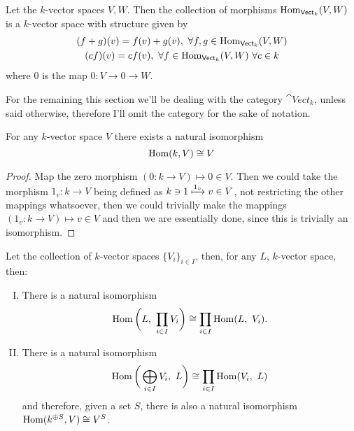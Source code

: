 \begin{definition}
  Let the \(k\)-vector spaces \(V, W\). Then the collection of morphisms
  \(\operatorname{Hom}_{\mathsf{Vect}_k}(V, W)\) is a \(k\)-vector space with structure given by
  \begin{gather*}
    (f + g)(v) = f(v) + g(v),\ \forall f, g \in \operatorname{Hom}_{\mathsf{Vect}_k}(V, W) \\
    (cf)(v) = c f(v),\ \forall f \in \operatorname{Hom}_{\mathsf{Vect}_k}(V, W)\ \forall c \in k
  \end{gather*}
  where \(0\) is the map \(0 : V \to 0 \to W\).
\end{definition}

\begin{remark}
  For the remaining this section we'll be dealing with the category
  \(\cat{Vect}_k\), unless said otherwise, therefore I'll omit the
  category for the sake of notation.
\end{remark}

\begin{proposition}
   For any \(k\)-vector space \(V\) there exists a natural isomorphism
   \[
     \operatorname{Hom}(k, V) \cong V
   \]
\end{proposition}

\begin{proof}
  Map the zero morphism \((0 : k \to V) \longmapsto 0 \in V\). Then we could take
  the morphism \(1_v : k \to V\) being defined as \(k \ni 1 \xmapsto{1_v} v \in
  V\), not restricting the other mappings whatsoever, then we could trivially
  make the mappings \((1_v : k \to V) \longmapsto v \in V\) and then we are
  essentially done, since this is trivially an isomorphism.
\end{proof}

\begin{proposition}
  Let the collection of \(k\)-vector spaces \(\{V_i\}_{i \in I}\), then, for any
  \(L\), \(k\)-vector space, then:
  \begin{enumerate}[I.]
    \item There is a natural isomorphism 
      \[
        \operatorname{Hom} \bigg( L,\ \prod_{i \in I} V_i \bigg) \cong \prod_{i \in
        I} \operatorname{Hom}(L,\ V_i).
      \]
    \item There is a natural isomorphism
      \[
        \operatorname{Hom}\bigg( \bigoplus_{i \in I} V_i,\ L \bigg) \cong
        \prod_{i \in I} \operatorname{Hom}(V_i,\ L)
      \] 
      and therefore, given a set \(S\), there is also a natural isomorphism
      \(\operatorname{Hom}(k^{\oplus S}, V) \cong V^S\).
  \end{enumerate}
\end{proposition}

